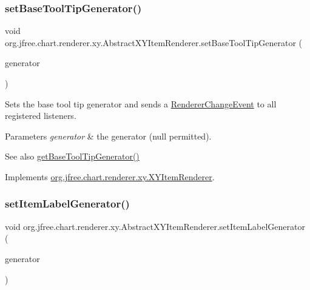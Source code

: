 \subsubsection{\texorpdfstring{set\+Base\+Tool\+Tip\+Generator()}{setBaseToolTipGenerator()}}
{\footnotesize\ttfamily void org.\+jfree.\+chart.\+renderer.\+xy.\+Abstract\+X\+Y\+Item\+Renderer.\+set\+Base\+Tool\+Tip\+Generator (\begin{DoxyParamCaption}\item[{\mbox{\hyperlink{interfaceorg_1_1jfree_1_1chart_1_1labels_1_1_x_y_tool_tip_generator}{X\+Y\+Tool\+Tip\+Generator}}}]{generator }\end{DoxyParamCaption})}

Sets the base tool tip generator and sends a \mbox{\hyperlink{}{Renderer\+Change\+Event}} to all registered listeners.


\begin{DoxyParams}{Parameters}
{\em generator} & the generator ({\ttfamily null} permitted).\\
\hline
\end{DoxyParams}
\begin{DoxySeeAlso}{See also}
\mbox{\hyperlink{classorg_1_1jfree_1_1chart_1_1renderer_1_1xy_1_1_abstract_x_y_item_renderer_a9c3702b29c250e9f75066e367c65cd5a}{get\+Base\+Tool\+Tip\+Generator()}} 
\end{DoxySeeAlso}


Implements \mbox{\hyperlink{interfaceorg_1_1jfree_1_1chart_1_1renderer_1_1xy_1_1_x_y_item_renderer_ae53df47412e048dfb68cf0cdf578c394}{org.\+jfree.\+chart.\+renderer.\+xy.\+X\+Y\+Item\+Renderer}}.

\mbox{\label{classorg_1_1jfree_1_1chart_1_1renderer_1_1xy_1_1_abstract_x_y_item_renderer_add7aa14845378a40b6db6159200cbab1}} 
\subsubsection{\texorpdfstring{set\+Item\+Label\+Generator()}{setItemLabelGenerator()}}
{\footnotesize\ttfamily void org.\+jfree.\+chart.\+renderer.\+xy.\+Abstract\+X\+Y\+Item\+Renderer.\+set\+Item\+Label\+Generator (\begin{DoxyParamCaption}\item[{\mbox{\hyperlink{interfaceorg_1_1jfree_1_1chart_1_1labels_1_1_x_y_item_label_generator}{X\+Y\+Item\+Label\+Generator}}}]{generator }\end{DoxyParamCaption})}

